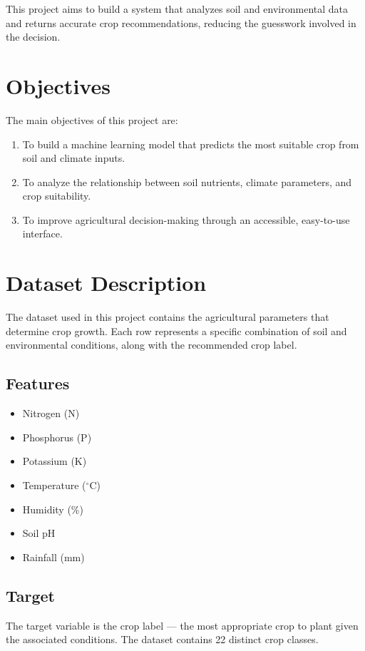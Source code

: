 \documentclass[11pt,a4paper]{article}
\begin{document}
This project aims to build a system that analyzes soil and environmental data and returns accurate crop recommendations, reducing the guesswork involved in the decision.

\section{Objectives}

The main objectives of this project are:
\begin{enumerate}
    \item To build a machine learning model that predicts the most suitable crop from soil and climate inputs.
    \item To analyze the relationship between soil nutrients, climate parameters, and crop suitability.
    \item To improve agricultural decision-making through an accessible, easy-to-use interface.
\end{enumerate}

\section{Dataset Description}

The dataset used in this project contains the agricultural parameters that determine crop growth. Each row represents a specific combination of soil and environmental conditions, along with the recommended crop label.

\subsection{Features}
\begin{itemize}
    \item Nitrogen (N)
    \item Phosphorus (P)
    \item Potassium (K)
    \item Temperature ($^\circ$C)
    \item Humidity (\%)
    \item Soil pH
    \item Rainfall (mm)
\end{itemize}

\subsection{Target}
The target variable is the crop label --- the most appropriate crop to plant given the associated conditions. The dataset contains 22 distinct crop classes.
\end{document}
